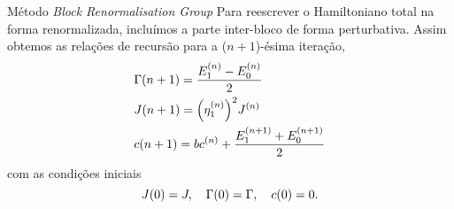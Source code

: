 \documentclass[brazil]{beamer}
\begin{document}
\begin{frame}{Método \textit{Block Renormalisation Group}}
    Para reescrever o Hamiltoniano total na forma renormalizada, incluímos a parte inter-bloco de forma perturbativa.
    Assim obtemos as relações de recursão para a (\( n + 1 \))-ésima iteração,
    \begin{align}
        & \Gamma (n + 1) = \frac{E_1^{(n)} - E_0^{(n)}}{2} \\
        & J (n + 1) = \qty( \eta_1^{(n)} )^2 J^{(n)} \\
        & c(n + 1) = b c^{(n)} + \frac{E_1^{(n + 1)} + E_0^{(n + 1)}}{2}
    \end{align}
    com as condições iniciais
    \begin{equation}
        J(0) = J \qc \Gamma (0) = \Gamma \qc c(0) = 0 .
    \end{equation}
\end{frame}

\end{document}

